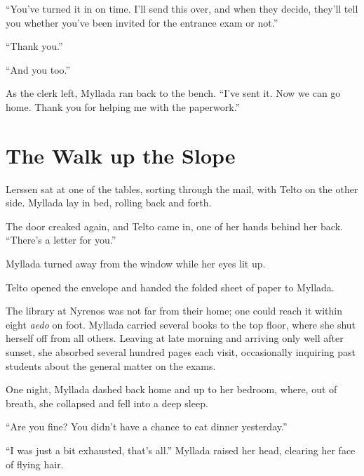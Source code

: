 ``You've turned it in on time. I'll send this over, and when they decide, they'll tell you whether you've been invited for the entrance exam or not.''

``Thank you.''

``And you too.''

As the clerk left, Myllada ran back to the bench. ``I've sent it. Now we can go home. Thank you for helping me with the paperwork.''

\chapter{The Walk up the Slope}

Lerssen sat at one of the tables, sorting through the mail, with Telto on the other side. Myllada lay in bed, rolling back and forth.

The door creaked again, and Telto came in, one of her hands behind her back. ``There's a letter for you.''

Myllada turned away from the window while her eyes lit up.

Telto opened the envelope and handed the folded sheet of paper to Myllada.


\centeredstars

The library at Nyrenos was not far from their home; one could reach it within eight \emph{aedo} on foot. Myllada carried several books to the top floor, where she shut herself off from all others. Leaving at late morning and arriving only well after sunset, she absorbed several hundred pages each visit, occasionally inquiring past students about the general matter on the exams.

One night, Myllada dashed back home and up to her bedroom, where, out of breath, she collapsed and fell into a deep sleep.

\centeredstars

``Are you fine? You didn't have a chance to eat dinner yesterday.''

``I was just a bit exhausted, that's all.'' Myllada raised her head, clearing her face of flying hair.

